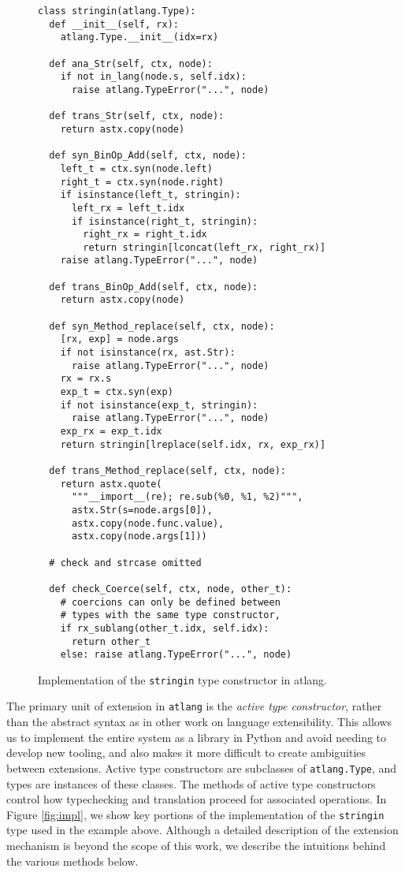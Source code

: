 \documentclass[9pt]{sig-alternate}
\theoremstyle{definition}
\begin{document}
\begin{figure}
\begin{lstlisting}
class stringin(atlang.Type):
  def __init__(self, rx):
    atlang.Type.__init__(idx=rx)

  def ana_Str(self, ctx, node):
    if not in_lang(node.s, self.idx):
      raise atlang.TypeError("...", node)

  def trans_Str(self, ctx, node):
    return astx.copy(node)

  def syn_BinOp_Add(self, ctx, node):
    left_t = ctx.syn(node.left)
    right_t = ctx.syn(node.right)
    if isinstance(left_t, stringin):
      left_rx = left_t.idx
      if isinstance(right_t, stringin):
        right_rx = right_t.idx
        return stringin[lconcat(left_rx, right_rx)]
    raise atlang.TypeError("...", node)

  def trans_BinOp_Add(self, ctx, node):
    return astx.copy(node)

  def syn_Method_replace(self, ctx, node):
    [rx, exp] = node.args
    if not isinstance(rx, ast.Str):
      raise atlang.TypeError("...", node)
    rx = rx.s
    exp_t = ctx.syn(exp)
    if not isinstance(exp_t, stringin):
      raise atlang.TypeError("...", node)
    exp_rx = exp_t.idx
    return stringin[lreplace(self.idx, rx, exp_rx)]

  def trans_Method_replace(self, ctx, node):
    return astx.quote(
      """__import__(re); re.sub(%0, %1, %2)""",
      astx.Str(s=node.args[0]),
      astx.copy(node.func.value),
      astx.copy(node.args[1]))
  
  # check and strcase omitted

  def check_Coerce(self, ctx, node, other_t):
    # coercions can only be defined between 
    # types with the same type constructor, 
    if rx_sublang(other_t.idx, self.idx):
      return other_t
    else: raise atlang.TypeError("...", node)
\end{lstlisting}
\vspace{-10px}
\caption{Implementation of the \texttt{stringin} type constructor in atlang.}
\label{fig:impl}

\label{fig:atimpl}\end{figure}
The primary unit of extension in \verb|atlang| is the \emph{active type constructor}, rather than the abstract syntax as in other work on language extensibility. This allows us to implement the entire system as a library in Python and avoid needing to develop new tooling, and also makes it more difficult to create ambiguities between extensions. Active type constructors are subclasses of \verb|atlang.Type|, and types are instances of these classes. The methods of active type constructors control how typechecking and translation proceed for associated operations. 
In Figure \ref{fig:impl}, we show key portions of the implementation of the \verb|stringin| type used in the example above. Although a detailed description of the extension mechanism is beyond the scope of this work, we describe the intuitions behind the various methods below.
\end{document}
